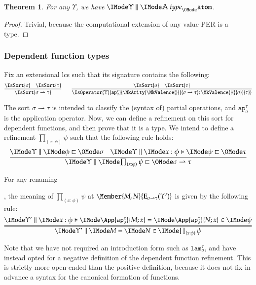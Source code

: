 \documentclass[11pt]{article}
\newtheorem{thm}{Theorem}[section]
\theoremstyle{definition}
\theoremstyle{notation}
\theoremstyle{remark}
\numberwithin{equation}{section}
\newcommand\Exprs{\mathbf{E}}
\begin{document}
\begin{thm}
  For any $\Upsilon$, we have $\IsType{\Upsilon}{\Atoms}{\SortAtom}$.
\end{thm}
\begin{proof}
  Trivial, because the computational extension of any value PER is a type.
\end{proof}

\subsubsection{Dependent function types}
\newcommand\SortArr[2]{#1\rightharpoonup #2}
\newcommand\OpLambda[2]{\mathtt{lam}_{#1}^{#2}}
\newcommand\OpAp[2]{\mathtt{ap}_{#1}^{#2}}

Fix an extensional lcs such that its signature contains the following:
\[
  \infer{
    \IsSort{\SortArr{\sigma}{\tau}}
  }{
    \IsSort{\sigma} &
    \IsSort{\tau}
  }
  \qquad
  \infer{
    \IsOperator{\Upsilon}{
      \OpAp{\sigma}{\tau}
    }{
      \MkArity{
        \MkValence{}{}{\SortArr{\sigma}{\tau}};
        \MkValence{}{}{\sigma}
      }{\tau}
    }
  }{
    \IsSort{\sigma} &
    \IsSort{\tau}
  }
\]

The sort $\SortArr{\sigma}{\tau}$ is intended to classify the (syntax of)
partial operations, and $\OpAp{\sigma}{\tau}$ is the application operator. Now,
we can define a refinement on this sort for dependent functions, and then prove
that it is a type. We intend to define a refinement $\prod_{(x:\phi)}\psi$
such that the following rule holds:
\[
  \infer{
    \Refines{\Upsilon}{\prod_{(x:\phi)}\psi}{\SortArr{\sigma}{\tau}}
  }{
    \Refines{\Upsilon}{\phi}{\sigma} &
    \FRefines{\Upsilon}{x:\phi}{\psi}{\tau}
  }
\]

For any renaming
, the meaning of $\prod_{(x:\phi)}\psi$ at
$\Member{M, N}{\Exprs_{\SortArr{\sigma}{\tau}}(\Upsilon')}$ is given by
the following rule:
\[
  \infer={
    \RMemEq{\Upsilon'}{M}{N}{
      \prod_{(x:\phi)}\psi
    }
  }{
    \FRMemEq{\Upsilon'}{x:\phi}{
      \App{\OpAp{\sigma}{\tau}}{M; x}
    }{
      \App{\OpAp{\sigma}{\tau}}{N; x}
    }{
      \psi
    }
  }
\]

Note that we have not required an introduction form such as
$\OpLambda{\sigma}{\tau}$, and have instead opted for a negative
definition of the dependent function refinement. This is strictly more
open-ended than the positive definition, because it does not fix in
advance a syntax for the canonical formation of functions.
\end{document}
